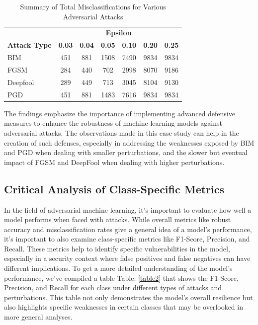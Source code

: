 \documentclass[10pt, conference, a4paper, final]{IEEEtran}
\begin{document}
\begin{table}[ht]
    \centering
    \caption{Summary of Total Misclassifications for Various Adversarial Attacks}
    \label{tab:misclassifications}
    \begin{tabular}{|l|c|c|c|c|c|c|}
    \hline
    & \multicolumn{6}{c|}{\textbf{Epsilon}} \\ \cline{2-7} 
    \multirow{-2}{*}{\textbf{Attack Type}} & \textbf{0.03} & \textbf{0.04} & \textbf{0.05} & \textbf{0.10} & \textbf{0.20} & \textbf{0.25} \\ \hline
    BIM & 451 & 881 & 1508 & 7490 & 9834 & 9834 \\ \hline
    FGSM & 284 & 440 & 702 & 2998 & 8070 & 9186 \\ \hline
    Deepfool & 289 & 449 & 713 & 3045 & 8104 & 9130 \\ \hline
    PGD & 451 & 881 & 1483 & 7616 & 9834 & 9834 \\ \hline
    \end{tabular}
\end{table}

The findings emphasize the importance of implementing advanced defensive measures to enhance the robustness of machine learning models against adversarial attacks. The observations made in this case study can help in the creation of such defenses, especially in addressing the weaknesses exposed by BIM and PGD when dealing with smaller perturbations, and the slower but eventual impact of FGSM and DeepFool when dealing with higher perturbations.

\subsection{Critical Analysis of Class-Specific Metrics}

In the field of adversarial machine learning, it's important to evaluate how well a model performs when faced with attacks. While overall metrics like robust accuracy and misclassification rates give a general idea of a model's performance, it's important to also examine class-specific metrics like F1-Score, Precision, and Recall. These metrics help to identify specific vulnerabilities in the model, especially in a security context where false positives and false negatives can have different implications. To get a more detailed understanding of the model's performance, we've compiled a table Table. \ref{table2} that shows the F1-Score, Precision, and Recall for each class under different types of attacks and perturbations. This table not only demonstrates the model's overall resilience but also highlights specific weaknesses in certain classes that may be overlooked in more general analyses.
\end{document}
